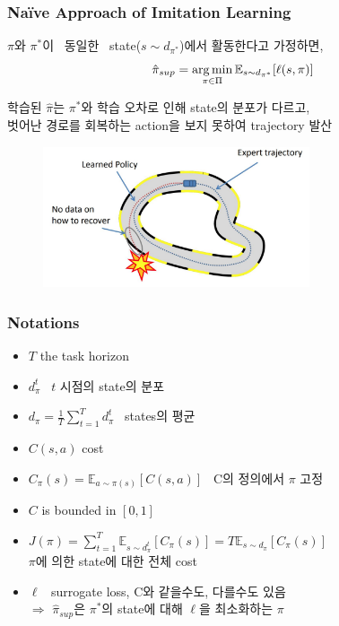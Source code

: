 \documentclass[11pt,xcolor={dvipsnames},hyperref={pdftex,pdfpagemode=UseNone,hidelinks,pdfdisplaydoctitle=true},usepdftitle=false]{beamer}
\begin{document}
\begin{frame}
\frametitle{Na\"{i}ve Approach of Imitation Learning}
\begin{defn}
    {\small $\pi$와 $\pi^*$이 \, 동일한 \, state($s \sim d_{\pi^*}$)에서 활동한다고 가정하면,}
    \begin{equation}
        \hat{\pi}_{sup} = \operatorname*{arg\,min}_{\pi \in \Pi}{\mathbb{E}_{s \sim d_{\pi^*}}[\ell(s,\pi)]}
    \end{equation}
\end{defn}

\vspace{-5mm}
{\footnotesize 학습된 $\hat{\pi}$는 $\pi^*$와 학습 오차로 인해 state의 분포가 다르고, \\ 벗어난 경로를 회복하는 action을 보지 못하여 trajectory 발산}

\begin{figure}
    \centering
    \includegraphics[width=0.7\textwidth]{figs/path.png}
\end{figure}
\end{frame}

\begin{frame}
\frametitle{Notations}
\begin{itemize}
    \item $T$ the task horizon
    \item $d^t_\pi$ \, $t$ 시점의 state의 분포
    \item $d_\pi = \frac{1}{T} \sum_{t=1}^T d^t_\pi$ \, states의 평균
    \item $C(s,a)$ cost
    \item $C_\pi(s) = \mathbb{E}_{a \sim \pi(s)}[C(s,a)]$ \, C의 정의에서 $\pi$ 고정
    \item $C$ is bounded in $[0,1]$
    \item $J(\pi) = \sum_{t=1}^T \mathbb{E}_{s \sim d^t_\pi}[C_\pi(s)] = T \mathbb{E}_{s \sim d_\pi}[C_\pi(s)]$ \\ $\pi$에 의한 state에 대한 전체 cost
    \item $\ell$ \, surrogate loss, C와 같을수도, 다를수도 있음 \\
    $\Rightarrow$ {\small $\hat{\pi}_{sup}$은 $\pi^*$의 state에 대해 $\ell$을 최소화하는 $\pi$}
\end{itemize}
\end{frame}
\end{document}
